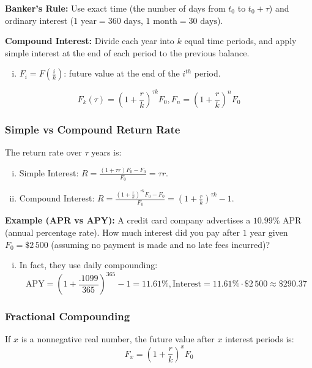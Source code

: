 \textbf{Banker's Rule: } Use exact time (the number of days from \(t_0\) to \(t_0 + \tau\)) and ordinary interest (\(1 \text{ year} = 360 \text{ days}\), \(1 \text{ month} = 30 \text{ days}\)).

\textbf{Compound Interest: } Divide each year into \(k\) equal time periods, and apply simple interest at the end of each period to the previous balance.
\begin{enumerate}[i.]
    \item \(F_i = F(\frac{i}{k})\): future value at the end of the \(i^{th}\) period.
\end{enumerate}
\begin{equation*}
    F_k(\tau) = (1+\frac{r}{k})^{\tau k} F_0, F_n = (1+\frac{r}{k})^nF_0
\end{equation*}

\subsubsection{Simple vs Compound Return Rate}
The return rate over \(\tau\) years is:
\begin{enumerate}[i.]
    \item Simple Interest: \(R = \frac{(1+\tau r)F_0 - F_0}{F_0} = \tau r\).

    \item Compound Interest: \(R = \frac{(1+\frac{r}{k})^{\tau k}F_0 - F_0}{F_0} = (1+\frac{r}{k})^{\tau k} - 1\).
\end{enumerate}

\textbf{Example (APR vs APY): } A credit card company advertises a \(10.99\%\) APR (annual percentage rate). How much interest did you pay after \(1\) year given \(F_0 = \$2\,500\) (assuming no payment is made and no late fees incurred)?
\begin{enumerate}[i.]
    \item In fact, they use daily compounding:
    \begin{equation*}
        \text{APY} = (1+\frac{.1099}{365})^{365} - 1 = 11.61\%, \text{Interest} = 11.61\% \cdot \$2\,500 \approx \$290.37
    \end{equation*}
\end{enumerate}

\subsubsection{Fractional Compounding}
If \(x\) is a nonnegative real number, the future value after \(x\) interest periods is:
\begin{equation*}
    F_x = (1+\frac{r}{k})^x F_0
\end{equation*}

